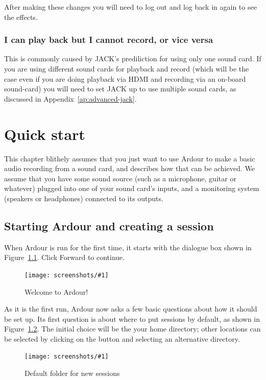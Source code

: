 \documentclass[10pt,a4paper]{book}
\newcommand{\button}[1]{#1}
\newcommand{\todo}[1]{\marginpar{\small\texttt{#1}}}
\newcommand{\screenshot}[3]{%
\begin{figure}[ht]%
\begin{center}
\texttt{[image: screenshots/\#1]}
\end{center}
\caption{#2}
\label{#3}
\end{figure}}
\begin{document}
After making these changes you will need to log out and log back in
again to see the effects.

\todo{Denormals?}
\todo{CPU frequency scaling?}

\subsection{I can play back but I cannot record, or vice versa}

This is commonly caused by JACK's prediliction for using only
one sound card.  If you are using different sound cards for playback
and record (which will be the case even if you are doing playback via
HDMI and recording via an on-board sound-card) you will need to set
JACK up to use multiple sound cards, as discussed in
Appendix~\ref{ap:advanced-jack}.


\chapter{Quick start}

This chapter blithely assumes that you just want to use Ardour to make
a basic audio recording from a sound card, and describes how that can
be achieved.  We assume that you have some sound source (such as a
microphone, guitar or whatever) plugged into one of your sound card's
inputs, and a monitoring system (speakers or headphones) connected to
its outputs.


\section{Starting Ardour and creating a session}

When Ardour is run for the first time, it starts with the dialogue box
shown in Figure~\ref{fig:welcome-to-ardour}.  Click \button{Forward} to continue.

\screenshot{welcome-to-ardour.png}{Welcome to Ardour!}{fig:welcome-to-ardour}

As it is the first run, Ardour now asks a few basic questions about
how it should be set up.  Its first question is about where to put
sessions by default, as shown in
Figure~\ref{fig:default-folder-for-new-sessions}.  The initial choice
will be the your home directory; other locations can be selected by
clicking on the button and selecting an alternative directory.

\screenshot{default-folder-for-new-sessions.png}{Default folder for new sessions}{fig:default-folder-for-new-sessions}
\end{document}

